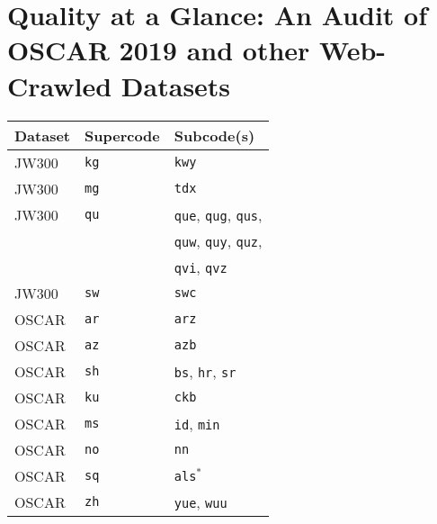 \chapter{Quality at a Glance: An Audit of OSCAR 2019 and other Web-Crawled Datasets}

\begin{table}[th!]
    \centering
    \begin{tabular}{lll}
        \toprule
        \textbf{Dataset } & \textbf{Supercode} & \textbf{Subcode(s)}                       \\
        \midrule
        JW300             & \texttt{kg}        & \texttt{kwy}                              \\
        JW300             & \texttt{mg}        & \texttt{tdx}                              \\
        JW300             & \texttt{qu}        & \texttt{que}, \texttt{qug}, \texttt{qus}, \\
                          &                    & \texttt{quw}, \texttt{quy}, \texttt{quz}, \\
                          &                    & \texttt{qvi}, \texttt{qvz}                \\
        JW300             & \texttt{sw}        & \texttt{swc}                              \\
        \midrule
        OSCAR             & \texttt{ar}        & \texttt{arz}                              \\
        OSCAR             & \texttt{az}        & \texttt{azb}                              \\
        OSCAR             & \texttt{sh}        & \texttt{bs}, \texttt{hr}, \texttt{sr}     \\
        OSCAR             & \texttt{ku}        & \texttt{ckb}                              \\
        OSCAR             & \texttt{ms}        & \texttt{id}, \texttt{min}                 \\
        OSCAR             & \texttt{no}        & \texttt{nn}                               \\
        OSCAR             & \texttt{sq}        & \texttt{als}$^{*}$                        \\
        OSCAR             & \texttt{zh}        & \texttt{yue}, \texttt{wuu}                \\

\end{tabular}
\end{table}
